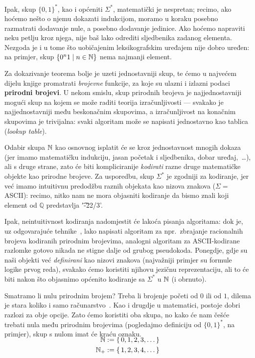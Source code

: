 Ipak, skup $\{0,1\}^*$, kao i općeniti $\Sigma^*$, matematički je nespretan; recimo, ako hoćemo nešto o njemu dokazati indukcijom, moramo u koraku posebno razmatrati dodavanje nule, a posebno dodavanje jedinice. Ako hoćemo napraviti neku petlju kroz njega, nije baš lako odrediti sljedbenika zadanog elementa. Nezgoda je i u tome što uobičajenim leksikografskim uređajem nije dobro uređen: na primjer, skup $\{0^n1\mid n\in{\mathbb N}\}$ nema najmanji element.

Za dokazivanje teorema bolje je uzeti jednostavniji skup, te ćemo u najvećem dijelu knjige promatrati \emph{brojevne} funkcije, za koje su ulazni i izlazni podaci \textbf{prirodni brojevi}. U nekom smislu, skup prirodnih brojeva je najjednostavniji mogući skup na kojem se može raditi teorija izračunljivosti --- svakako je najjednostavniji među beskonačnim skupovima, a izračunljivost na konačnim skupovima je trivijalna: svaki algoritam može se napisati jednostavno kao tablica (\emph{lookup table}).

Odabir skupa ${\mathbb N}$ kao osnovnog isplatit će se kroz jednostavnost mnogih dokaza (jer imamo matematičku indukciju, jasan početak i sljedbenika, dobar uređaj,~\ldots), ali s druge strane, zato će biti kompliciranije \emph{kodirati} razne druge matematičke objekte kao prirodne brojeve. Za usporedbu, skup $\Sigma^*$ je zgodniji za kodiranje, jer već imamo intuitivnu predodžbu raznih objekata kao nizova znakova ($\Sigma=$ ASCII): recimo, nitko nam ne mora objasniti kodiranje da bismo znali koji element od $\mathbb Q$ predstavlja \t{'-22/3'}.

Ipak, neintuitivnost kodiranja nadomjestit će lakoća pisanja algoritama: dok je, uz odgovarajuće tehnike~\cite{posav}, lako napisati algoritam za npr.\ zbrajanje racionalnih brojeva kodiranih prirodnim brojevima, analogni algoritam za ASCII-kodirane razlomke gotovo nikada ne stigne dalje od grubog pseudokoda. Ponegdje, gdje su naši objekti već \emph{definirani} kao nizovi znakova (najvažniji primjer su formule logike prvog reda), svakako ćemo koristiti njihovu jezičnu reprezentaciju, ali to će biti nakon što objasnimo općenito kodiranje sa $\Sigma^*$ u ${\mathbb N}$ (i obrnuto).

Smatramo li nulu prirodnim brojem? Treba li brojenje početi od $0$ ili od $1$, dilema je stara koliko i samo računarstvo~\cite{note:EWD831}. Kao i drugdje u matematici, postoje dobri razlozi za obje opcije. Zato ćemo koristiti oba skupa, no kako će nam češće trebati nula među prirodnim brojevima (pogledajmo definiciju od $\{0,1\}^*$, na primjer), skup s nulom imat će kraću oznaku.
\begin{align}
    \SwapAboveDisplaySkip
\N&:=\{\,0,1,2,3,\dotsc\}\\
\N_+&:=\{\,1,2,3,4,\dotsc\}
\end{align}

